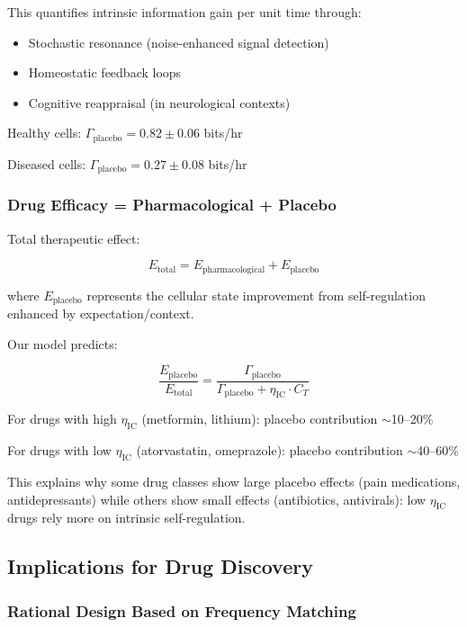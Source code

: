 \documentclass{article}
\begin{document}
This quantifies intrinsic information gain per unit time through:
\begin{itemize}
    \item Stochastic resonance (noise-enhanced signal detection)
    \item Homeostatic feedback loops
    \item Cognitive reappraisal (in neurological contexts)
\end{itemize}

Healthy cells: $\Gamma_{\text{placebo}} = 0.82 \pm 0.06$ bits/hr

Diseased cells: $\Gamma_{\text{placebo}} = 0.27 \pm 0.08$ bits/hr

\subsubsection{Drug Efficacy = Pharmacological + Placebo}

Total therapeutic effect:

\begin{equation}
E_{\text{total}} = E_{\text{pharmacological}} + E_{\text{placebo}}
\end{equation}

where $E_{\text{placebo}}$ represents the cellular state improvement from self-regulation enhanced by expectation/context.

Our model predicts:

\begin{equation}
\frac{E_{\text{placebo}}}{E_{\text{total}}} = \frac{\Gamma_{\text{placebo}}}{\Gamma_{\text{placebo}} + \eta_{\text{IC}} \cdot C_T}
\end{equation}

For drugs with high $\eta_{\text{IC}}$ (metformin, lithium): placebo contribution $\sim$10--20\%

For drugs with low $\eta_{\text{IC}}$ (atorvastatin, omeprazole): placebo contribution $\sim$40--60\%

This explains why some drug classes show large placebo effects (pain medications, antidepressants) while others show small effects (antibiotics, antivirals): low $\eta_{\text{IC}}$ drugs rely more on intrinsic self-regulation.

\subsection{Implications for Drug Discovery}

\subsubsection{Rational Design Based on Frequency Matching}
\end{document}
